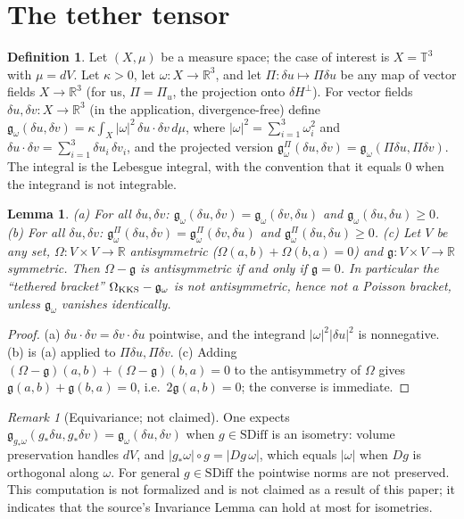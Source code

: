 \documentclass[11pt]{amsart}
\newtheorem{lemma}[theorem]{Lemma}
\theoremstyle{definition}\newtheorem{definition}[theorem]{Definition}
\theoremstyle{remark}\newtheorem{remark}[theorem]{Remark}
\newcommand{\T}{\mathbb{T}^3}
\begin{document}
\section{The tether tensor}
\begin{definition}
Let $(X,\mu)$ be a measure space; the case of interest is $X=\T$ with $\mu=dV$. Let $\kappa>0$, let
$\omega\colon X\to\mathbb R^3$, and let $\Pi\colon\delta u\mapsto\Pi\delta u$ be any map of vector fields $X\to\mathbb R^3$
(for us, $\Pi=\Pi_u$, the projection onto $\delta H^\perp$). For vector fields $\delta u,\delta v\colon X\to\mathbb R^3$ (in the
application, divergence-free) define
$\mathfrak g_\omega(\delta u,\delta v)=\kappa\int_X|\omega|^2\,\delta u\cdot\delta v\,d\mu$, where $|\omega|^2=\sum_{i=1}^3\omega_i^2$ and
$\delta u\cdot\delta v=\sum_{i=1}^3\delta u_i\,\delta v_i$, and the projected version
$\mathfrak g^\Pi_\omega(\delta u,\delta v)=\mathfrak g_\omega(\Pi\delta u,\Pi\delta v)$. The integral is the Lebesgue integral, with the
convention that it equals $0$ when the integrand is not integrable.
\end{definition}
\begin{lemma}\label{lem:sym}
(a) For all $\delta u,\delta v$: $\mathfrak g_\omega(\delta u,\delta v)=\mathfrak g_\omega(\delta v,\delta u)$ and $\mathfrak g_\omega(\delta u,\delta u)\ge0$.
(b) For all $\delta u,\delta v$: $\mathfrak g^\Pi_\omega(\delta u,\delta v)=\mathfrak g^\Pi_\omega(\delta v,\delta u)$ and $\mathfrak g^\Pi_\omega(\delta u,\delta u)\ge0$.
(c) Let $V$ be any set, $\Omega\colon V\times V\to\mathbb R$ antisymmetric ($\Omega(a,b)+\Omega(b,a)=0$) and $\mathfrak g\colon V\times V\to\mathbb R$
symmetric. Then $\Omega-\mathfrak g$ is antisymmetric if and only if $\mathfrak g=0$. In particular the ``tethered bracket''
$\Omega_{\rm KKS}-\mathfrak g_\omega$ is not antisymmetric, hence not a Poisson bracket, unless $\mathfrak g_\omega$ vanishes identically.
\end{lemma}
\begin{proof}(a) $\delta u\cdot\delta v=\delta v\cdot\delta u$ pointwise, and the integrand $|\omega|^2|\delta u|^2$ is nonnegative.
(b) is (a) applied to $\Pi\delta u,\Pi\delta v$. (c) Adding $(\Omega-\mathfrak g)(a,b)+(\Omega-\mathfrak g)(b,a)=0$ to the
antisymmetry of $\Omega$ gives $\mathfrak g(a,b)+\mathfrak g(b,a)=0$, i.e.\ $2\mathfrak g(a,b)=0$; the converse is immediate.\end{proof}
\begin{remark}[Equivariance; not claimed]\label{rem:inv}
One expects $\mathfrak g_{g_*\omega}(g_*\delta u,g_*\delta v)=\mathfrak g_\omega(\delta u,\delta v)$ when $g\in\mathrm{SDiff}$ is an isometry:
volume preservation handles $dV$, and $|g_*\omega|\circ g=|Dg\,\omega|$, which equals $|\omega|$ when $Dg$ is orthogonal along $\omega$.
For general $g\in\mathrm{SDiff}$ the pointwise norms are not preserved. This computation is not formalized and is not
claimed as a result of this paper; it indicates that the source's Invariance Lemma can hold at most for isometries.
\end{remark}
\end{document}

